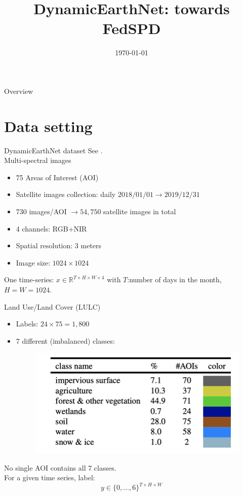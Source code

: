 \documentclass[aspectratio=169,xcolor=dvipsnames]{beamer}
\title{DynamicEarthNet: towards FedSPD}
\subtitle{}
\author{}
\institute{}
\date{\today}
\begin{document}
\begin{frame}
    \titlepage
\end{frame}

\begin{frame}{Overview}
    \tableofcontents
\end{frame}

\section{Data setting}

\begin{frame}{DynamicEarthNet dataset}
See \cite{toker2022dynamicearthnet}. \\
Multi-spectral images
\begin{itemize}
    \item 75 Areas of Interest (AOI)
    \item Satellite images collection: daily $2018/01/01 \to 2019/12/31$
    \item 730 images/AOI $\to 54,750$ satellite images in total
    \item 4 channels: RGB+NIR
    \item Spatial resolution: 3 meters
    \item Image size: $1024 \times 1024$
\end{itemize}
One time-series: $x\in \mathbb{R}^{T\times H \times W \times 4}$ with $T$:number of days in the month, $H=W=1024$.
\end{frame}

\begin{frame}{Land Use/Land Cover (LULC)}
\begin{itemize}
    \item Labels: $24\times 75=1,800$
    \item 7 different (imbalanced) classes:
\begin{figure}
    \centering
    \includegraphics[width=0.5\linewidth]{LULC.png}
\end{figure}
\end{itemize}
No single AOI contains all 7 classes.\\
For a given time series, label:
$$y\in \{0,\dots, 6\}^{T\times H \times W}$$
\end{frame}
\end{document}
